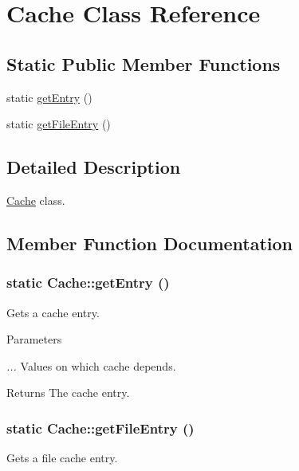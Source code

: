 \hypertarget{classCache}{
\section{Cache Class Reference}
\label{classCache}
}
\subsection*{Static Public Member Functions}
\begin{DoxyCompactItemize}
\item 
static \hyperlink{classCache_a8ba856ba59edee1e77c4f16acf2d5865}{getEntry} ()
\item 
static \hyperlink{classCache_add3c57a2ca3d15853f9957a4c5725290}{getFileEntry} ()
\end{DoxyCompactItemize}


\subsection{Detailed Description}
\hyperlink{classCache}{Cache} class. 

\subsection{Member Function Documentation}
\hypertarget{classCache_a8ba856ba59edee1e77c4f16acf2d5865}{
\subsubsection[{getEntry}]{\setlength{\rightskip}{0pt plus 5cm}static Cache::getEntry ()}}
\label{classCache_a8ba856ba59edee1e77c4f16acf2d5865}
Gets a cache entry.


\begin{DoxyParams}{Parameters}
\item[{\em ...}]Values on which cache depends.\end{DoxyParams}
\begin{DoxyReturn}{Returns}
The cache entry. 
\end{DoxyReturn}
\hypertarget{classCache_add3c57a2ca3d15853f9957a4c5725290}{
\subsubsection[{getFileEntry}]{\setlength{\rightskip}{0pt plus 5cm}static Cache::getFileEntry ()}}
\label{classCache_add3c57a2ca3d15853f9957a4c5725290}
Gets a file cache entry.


